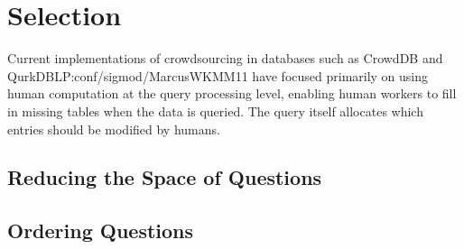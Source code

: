 \section{Selection}

Current implementations of crowdsourcing in databases such as CrowdDB \cite{DBLP:conf/sigmod/FranklinKKRX11} and Qurk{DBLP:conf/sigmod/MarcusWKMM11} have focused primarily on using human computation at the query processing level, enabling human workers to fill in missing tables when the data is queried.  The query itself allocates which entries should be modified by humans. 




\subsection{Reducing the Space of Questions}

\subsection{Ordering Questions}


